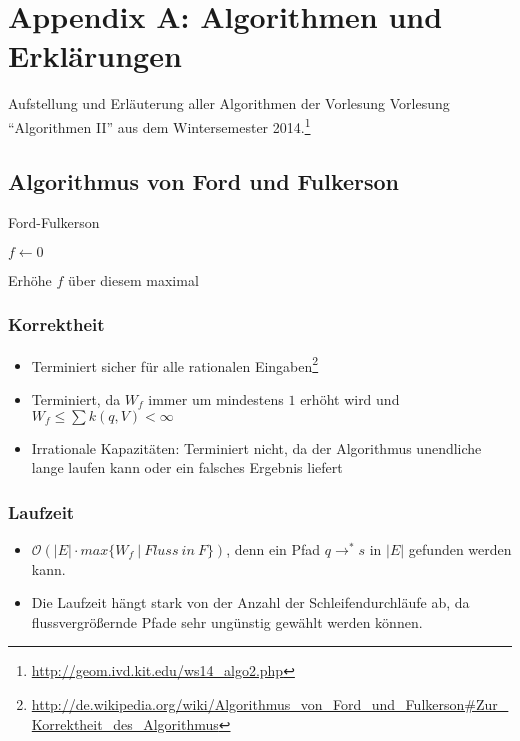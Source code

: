 \section{Appendix A: Algorithmen und Erklärungen}

Aufstellung und Erläuterung aller Algorithmen der Vorlesung Vorlesung "`Algorithmen II"' aus dem Wintersemester 2014.\footnote{\url{http://geom.ivd.kit.edu/ws14_algo2.php}}

\subsection{Algorithmus von Ford und Fulkerson}

\begin{algorithm}[H]
	\caption{Ford-Fulkerson}

	\BlankLine

	$f \longleftarrow 0$

	 {
		Erhöhe $f$ über diesem maximal
	}
\end{algorithm}

\subsubsection{Korrektheit}
\begin{itemize}
	\item Terminiert sicher für alle rationalen Eingaben\footnote{\url{http://de.wikipedia.org/wiki/Algorithmus_von_Ford_und_Fulkerson\#Zur_Korrektheit_des_Algorithmus}}
	\item Terminiert, da \(W_f\) immer um mindestens \(1\) erhöht wird und \(W_f \leq \sum k(q,V) < \infty\)
	\item Irrationale Kapazitäten: Terminiert nicht, da der Algorithmus unendliche lange laufen kann oder ein falsches Ergebnis liefert
\end{itemize}

\subsubsection{Laufzeit}
\begin{itemize}
	\item \(\mathcal{O}(|E| \cdot max\{W_f~|~Fluss~in~F\})\), denn ein Pfad \(q \rightarrow^* s\) in \(|E|\) gefunden werden kann.
	\item Die Laufzeit hängt stark von der Anzahl der Schleifendurchläufe ab, da flussvergrößernde Pfade sehr ungünstig gewählt werden können.
\end{itemize}



